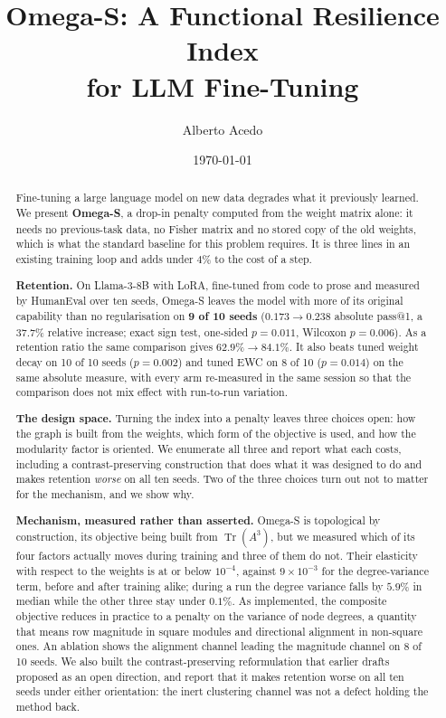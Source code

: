\documentclass[11pt,a4paper]{article}
\title{\textbf{Omega-S: A Functional Resilience Index\\for LLM Fine-Tuning}}
\author[1]{Alberto Acedo}
\affil[1]{Biome Makers Inc.}
\date{%
  \small \today}
\begin{document}
\maketitle

\begin{abstract}
Fine-tuning a large language model on new data degrades what it previously
learned.
We present \textbf{Omega-S}, a drop-in penalty computed from the weight matrix
alone: it needs no previous-task data, no Fisher matrix and no stored copy of
the old weights, which is what the standard baseline for this problem requires.
It is three lines in an existing training loop and adds under $4\%$ to the
cost of a step.

\textbf{Retention.} On Llama-3-8B with LoRA, fine-tuned from code to prose and
measured by HumanEval over ten seeds, Omega-S leaves the model with more of its
original capability than no regularisation on \textbf{9 of 10 seeds}
($0.173\to0.238$ absolute pass@1, a $37.7\%$ relative increase; exact sign test,
one-sided $p=0.011$, Wilcoxon $p=0.006$). As a retention ratio the same
comparison gives $62.9\%\to84.1\%$. It also beats tuned weight decay on 10 of 10
seeds ($p=0.002$) and tuned EWC on 8 of 10 ($p=0.014$) on the same absolute
measure, with every arm re-measured in the same session so that the comparison
does not mix effect with run-to-run variation.

\textbf{The design space.} Turning the index into a penalty leaves three
choices open: how the graph is built from the weights, which form of the
objective is used, and how the modularity factor is oriented. We enumerate all
three and report what each costs, including a contrast-preserving construction
that does what it was designed to do and makes retention \emph{worse} on all ten
seeds. Two of the three choices turn out not to matter for the mechanism, and we
show why.

\textbf{Mechanism, measured rather than asserted.} Omega-S is topological by
construction, its objective being built from $\operatorname{Tr}(A^3)$, but we
measured which of its four factors actually moves during training and three of
them do not. Their elasticity with respect to the weights is at or below
$10^{-4}$, against $9\times10^{-3}$ for the degree-variance term, before and
after training alike; during a run the degree variance falls by $5.9\%$ in
median while the other three stay under $0.1\%$. As implemented, the composite
objective reduces in practice to a penalty on the variance of node degrees, a
quantity that means row magnitude in square modules and directional alignment in
non-square ones. An ablation shows the alignment channel leading the magnitude
channel on 8 of 10 seeds. We also built the contrast-preserving reformulation
that earlier drafts proposed as an open direction, and report that it makes
retention worse on all ten seeds under either orientation: the inert clustering
channel was not a defect holding the method back.


\end{abstract}
\end{document}
